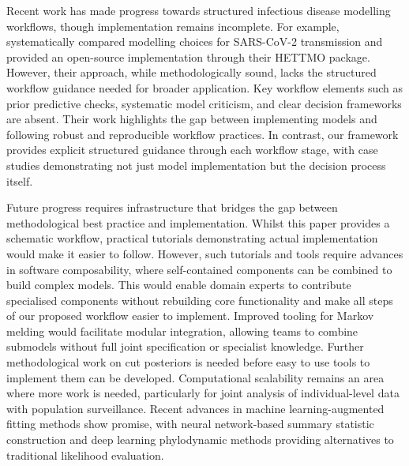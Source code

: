 \documentclass{article}
\begin{document}
Recent work has made progress towards structured infectious disease modelling workflows, though implementation remains incomplete.
For example, \citet{bouman2024bayesian} systematically compared modelling choices for SARS-CoV-2 transmission and provided an open-source implementation through their HETTMO package.
However, their approach, while methodologically sound, lacks the structured workflow guidance needed for broader application.
Key workflow elements such as prior predictive checks, systematic model criticism, and clear decision frameworks are absent.
Their work highlights the gap between implementing models and following robust and reproducible workflow practices.
In contrast, our framework provides explicit structured guidance through each workflow stage, with case studies demonstrating not just model implementation but the decision process itself.


Future progress requires infrastructure that bridges the gap between methodological best practice and implementation.
Whilst this paper provides a schematic workflow, practical tutorials demonstrating actual implementation would make it easier to follow.
However, such tutorials and tools require advances in software composability, where self-contained components can be combined to build complex models.
This would enable domain experts to contribute specialised components without rebuilding core functionality and make all steps of our proposed workflow easier to implement.
Improved tooling for Markov melding would facilitate modular integration, allowing teams to combine submodels without full joint specification or specialist knowledge. Further methodological work on cut posteriors \citep{liu2025general} is needed before easy to use tools to implement them can be developed.
Computational scalability remains an area where more work is needed, particularly for joint analysis of individual-level data with population surveillance.
Recent advances in machine learning-augmented fitting methods show promise, with neural network-based summary statistic construction \citep{raynal2019abc} and deep learning phylodynamic methods \citep{voznica2022deep} providing alternatives to traditional likelihood evaluation.

\end{document}
